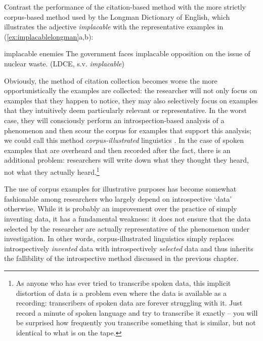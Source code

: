 Contrast the performance of the citation-based method with the more strictly corpus-based method used by the Longman Dictionary of English, which illustrates the adjective \textit{implacable} with the representative examples in (\ref{ex:implacablelongman}a,b):

\begin{exe}
\ex
\begin{xlist} 
\label{ex:implacablelongman}
\ex implacable enemies
\ex The government faces implacable opposition on the issue of nuclear waste. (LDCE, s.v. \textit{implacable})
\end{xlist}
\end{exe}

Obviously, the method of citation collection becomes worse the more opportunistically the examples are collected: the researcher will not only focus on examples that they happen to notice, they may also selectively focus on examples that they intuitively deem particularly relevant or representative. In the worst case, they will consciously perform an introspection-based analysis of a phenomenon and then scour the corpus for examples that support this analysis; we could call this method \emph{corpus-illustrated} linguistics \citep[cf.][]{tummers_usage-based_2005}. In the case of spoken examples that are overheard and then recorded after the fact, there is an additional problem: researchers will write down what they thought they heard, not what they actually heard.\footnote{As anyone who has ever tried to transcribe spoken data, this implicit distortion of data is a problem even where the data is available as a recording: transcribers of spoken data are forever struggling with it. Just record a minute of spoken language and try to transcribe it exactly -- you will be surprised how frequently you transcribe something that is similar, but not identical to what is on the tape.} 

The use of corpus examples for illustrative purposes has become somewhat fashionable among researchers who largely depend on introspective `data' otherwise. While it is probably an improvement over the practice of simply inventing data, it has a fundamental weakness: it does not ensure that the data selected by the researcher are actually representative of the phenomenon under investigation. In other words, corpus-illustrated linguistics simply replaces introspectively \emph{invented} data with introspectively \emph{selected} data and thus inherits the fallibility of the introspective method discussed in the previous chapter.

